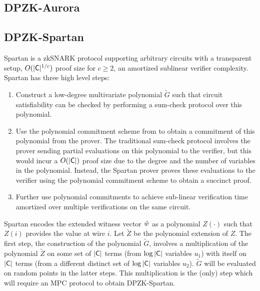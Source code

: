 \subsection{DPZK-Aurora}


\subsection{DPZK-Spartan}
Spartan \cite{spartan} is a zkSNARK protocol supporting arbitrary circuits with a transparent setup, $O(|\mathsf{C}|^{1/c})$ proof size for $c \geq 2$, an amortized sublinear verifier complexity. Spartan has three high level steps:
\begin{enumerate}
\item Construct a low-degree multivariate polynomial $\tilde{G}$ such that circuit satisfiability can be checked by performing a sum-check protocol \cite{sumcheck} over this polynomial.
\item Use the polynomial commitment scheme from \cite{hyrax} to obtain a commitment of this polynomial from the prover. The traditional sum-check protocol involves the prover sending partial evaluations on this polynomial to the verifier, but this would incur a $O(|\mathsf{C}|)$ proof size due to the degree and the number of variables in the polynomial. Instead, the Spartan prover proves these evaluations to the verifier using the polynomial commitment scheme to obtain a succinct proof.
\item Further use polynomial commitments to achieve sub-linear verification time amortized over multiple verifications on the same circuit.
\end{enumerate}
Spartan encodes the extended witness vector $\hat{w}$ as a polynomial $Z(\cdot)$ such that $Z(i)$ provides the value at wire $i$. Let $\tilde{Z}$ be the polynomial extension of $Z$.
The first step, the construction of the polynomial $\tilde{G}$, involves a multiplication of the polynomial $\tilde{Z}$ on some set of $|\mathsf{C}|$ terms (from $\log |\mathsf{C}|$ variables $u_1$) with itself on $|\mathsf{C}|$ terms (from a different distinct set of $\log |\mathsf{C}|$ variables $u_2$). $\tilde{G}$ will be evaluated on random points in the latter steps. This multiplication is the (only) step which will require an MPC protocol to obtain DPZK-Spartan. 

